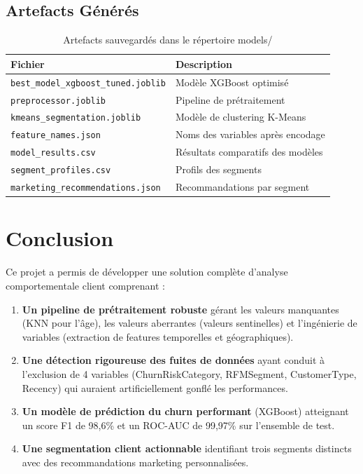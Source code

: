 \documentclass[11pt,a4paper]{article}
\begin{document}
\subsection{Artefacts Générés}

\begin{table}[H]
\centering
\begin{tabular}{ll}
\toprule
\textbf{Fichier} & \textbf{Description} \\
\midrule
\texttt{best\_model\_xgboost\_tuned.joblib} & Modèle XGBoost optimisé \\
\texttt{preprocessor.joblib} & Pipeline de prétraitement \\
\texttt{kmeans\_segmentation.joblib} & Modèle de clustering K-Means \\
\texttt{feature\_names.json} & Noms des variables après encodage \\
\texttt{model\_results.csv} & Résultats comparatifs des modèles \\
\texttt{segment\_profiles.csv} & Profils des segments \\
\texttt{marketing\_recommendations.json} & Recommandations par segment \\
\bottomrule
\end{tabular}
\caption{Artefacts sauvegardés dans le répertoire models/}
\end{table}

\section{Conclusion}

Ce projet a permis de développer une solution complète d'analyse comportementale client comprenant :

\begin{enumerate}
    \item \textbf{Un pipeline de prétraitement robuste} gérant les valeurs manquantes (KNN pour l'âge), les valeurs aberrantes (valeurs sentinelles) et l'ingénierie de variables (extraction de features temporelles et géographiques).

    \item \textbf{Une détection rigoureuse des fuites de données} ayant conduit à l'exclusion de 4 variables (ChurnRiskCategory, RFMSegment, CustomerType, Recency) qui auraient artificiellement gonflé les performances.

    \item \textbf{Un modèle de prédiction du churn performant} (XGBoost) atteignant un score F1 de 98,6\% et un ROC-AUC de 99,97\% sur l'ensemble de test.

    \item \textbf{Une segmentation client actionnable} identifiant trois segments distincts avec des recommandations marketing personnalisées.
\end{enumerate}
\end{document}
